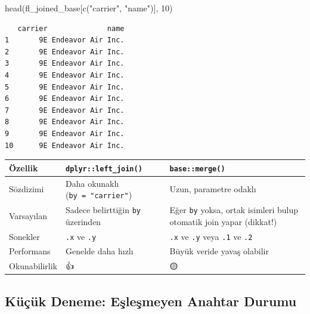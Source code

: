 \documentclass[
  letterpaper,
  DIV=11,
  numbers=noendperiod]{scrreprt}
\newenvironment{Shaded}{\begin{snugshade}}{\end{snugshade}}
\newcommand{\DecValTok}[1]{\textcolor[rgb]{0.68,0.00,0.00}{#1}}
\newcommand{\FunctionTok}[1]{\textcolor[rgb]{0.28,0.35,0.67}{#1}}
\newcommand{\NormalTok}[1]{\textcolor[rgb]{0.00,0.23,0.31}{#1}}
\newcommand{\StringTok}[1]{\textcolor[rgb]{0.13,0.47,0.30}{#1}}
\begin{document}
\begin{Shaded}
\begin{Highlighting}[]
\FunctionTok{head}\NormalTok{(fl\_joined\_base[}\FunctionTok{c}\NormalTok{(}\StringTok{"carrier"}\NormalTok{, }\StringTok{"name"}\NormalTok{)], }\DecValTok{10}\NormalTok{)}
\end{Highlighting}
\end{Shaded}

\begin{verbatim}
   carrier              name
1       9E Endeavor Air Inc.
2       9E Endeavor Air Inc.
3       9E Endeavor Air Inc.
4       9E Endeavor Air Inc.
5       9E Endeavor Air Inc.
6       9E Endeavor Air Inc.
7       9E Endeavor Air Inc.
8       9E Endeavor Air Inc.
9       9E Endeavor Air Inc.
10      9E Endeavor Air Inc.
\end{verbatim}

\begin{longtable}[]{@{}
  >{\raggedright\arraybackslash}p{}
  >{\raggedright\arraybackslash}p{}
  >{\raggedright\arraybackslash}p{}@{}}
\toprule\noalign{}
\begin{minipage}[b]{\linewidth}\raggedright
Özellik
\end{minipage} & \begin{minipage}[b]{\linewidth}\raggedright
\texttt{dplyr::left\_join()}
\end{minipage} & \begin{minipage}[b]{\linewidth}\raggedright
\texttt{base::merge()}
\end{minipage} \\
\midrule\noalign{}
\endhead
\bottomrule\noalign{}
\endlastfoot
Sözdizimi & Daha okunaklı (\texttt{by\ =\ "carrier"}) & Uzun, parametre
odaklı \\
Varsayılan & Sadece belirttiğin \texttt{by} üzerinden & Eğer \texttt{by}
yoksa, ortak isimleri bulup otomatik join yapar (dikkat!) \\
Sonekler & \texttt{.x} ve \texttt{.y} & \texttt{.x} ve \texttt{.y} veya
\texttt{.1} ve \texttt{.2} \\
Performans & Genelde daha hızlı & Büyük veride yavaş olabilir \\
Okunabilirlik & 👍 & 🟡 \\
\end{longtable}

\subsection*{Küçük Deneme: Eşleşmeyen Anahtar
Durumu}\label{kuxfcuxe7uxfck-deneme-eux15fleux15fmeyen-anahtar-durumu}
\end{document}
